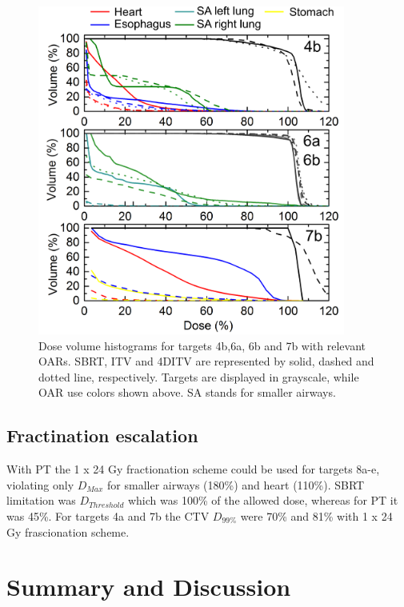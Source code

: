 \documentclass[type=dr, dr=rernat, accentcolor=tud7b,colorbacktitle, bigchapter, openright, twoside, 12pt ]{tudthesis}
\begin{document}
\newpage
\begin{figure}[H]
	\begin{center}
		\includegraphics[width=0.9\textwidth]{./Images/DVH_legend.png}
		\caption{Dose volume histograms for targets 4b,6a, 6b and 7b with relevant OARs. SBRT, ITV and 4DITV are represented by solid, dashed and dotted line, respectively. Targets are displayed
		in grayscale, while OAR use colors shown above. SA stands for smaller airways.}
		\label{Fig:dvh}
	\end{center}
\end{figure}
\newpage


\subsection{Fractination escalation}

With PT the 1 x 24 Gy fractionation scheme could be used for targets 8a-e, violating only $D_{Max}$ for smaller airways (180\%) and heart (110\%). SBRT limitation was $D_{Threshold}$ which was 100\% of the allowed dose, whereas for PT it was 45\%.
For targets 4a and 7b the CTV $D_{99\%}$ were 70\% and 81\% with 1 x 24 Gy frascionation scheme.

\section{Summary and Discussion}
\end{document}
